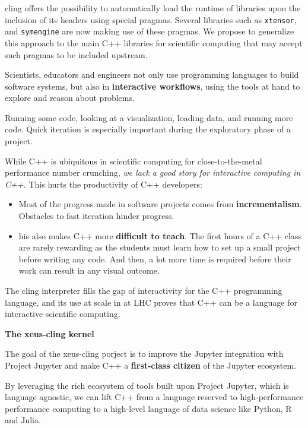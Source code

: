 \begin{task}[title=Interactive C++ in Jupyter with XEUS,
  id=xeus-cpp,
  lead=QS,
  PM=12,
  wphases={0-48},
  partners={QS,UPSUD}
]
\begin{compactenum}
  \begin{compactenum}
  \item
    cling offers the possibility to automatically load the runtime of
    libraries upon the inclusion of its headers using special pragmas.
    Several libraries such as \texttt{xtensor}, and \texttt{symengine}
    are now making use of these pragmas. We propose to generalize this
    approach to the main C++ libraries for scientific computing that may
    accept such pragmas to be included upstream.
  \end{compactenum}
\end{compactenum}

Scientists, educators and engineers not only use programming languages
to build software systems, but also in \textbf{interactive workflows},
using the tools at hand to explore and reason about problems.

Running some code, looking at a visualization, loading data, and running
more code. Quick iteration is especially important during the
exploratory phase of a project.

While C++ is ubiquitous in scientific computing for close-to-the-metal
performance number crunching, \emph{we lack a good story for interactive
computing in C++.} This hurts the productivity of C++ developers:

\begin{itemize}
\item
  Most of the progress made in software projects comes from
  \textbf{incrementalism}. Obstacles to fast iteration hinder progress.
\item
  his also makes C++ more \textbf{difficult to teach}. The first hours
  of a C++ class are rarely rewarding as the students must learn how to
  set up a small project before writing any code. And then, a lot more
  time is required before their work can result in any visual outcome.
\end{itemize}

The cling interpreter fills the gap of interactivity for the C++
programming language, and its use at scale in at LHC proves that C++ can
be a language for interactive scientific computing.

\textbf{The xeus-cling kernel}

The goal of the xeus-cling porject is to improve the Jupyter integration
with Project Jupyter and make C++ a \textbf{first-class citizen} of the
Jupyter ecosystem.

By leveraging the rich ecosystem of tools built upon Project Jupyter,
which is language agnostic, we can lift C++ from a language reserved to
high-performance performance computing to a high-level language of data
science like Python, R and Julia.


\end{task}
